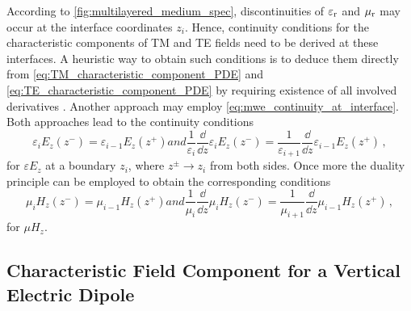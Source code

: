 According to \cref{fig:multilayered_medium_spec}, discontinuities of $\varepsilon_{\mathrm{r}}$ and
$\mu_{\mathrm{r}}$ may occur at the interface coordinates $z_i$.
Hence, continuity conditions for the characteristic components of \ac{TM} and
\ac{TE} fields need to be derived at these interfaces.
A heuristic way to obtain such conditions is to deduce them directly
from \eqref{eq:TM_characteristic_component_PDE} and
\eqref{eq:TE_characteristic_component_PDE} by requiring existence of all 
involved derivatives \cite[47]{Chew1999}.
Another approach may employ \eqref{eq:mwe_continuity_at_interface}.
Both approaches lead to the continuity conditions
\begin{subequations}\label{eq:TM_continuity}
	\begin{equation}\label{eq:TM_continuity_1}
		\varepsilon_i E_{z} \left(z^{-}\right) =
		\varepsilon_{i-1} E_{z} \left(z^{+}\right)
	\end{equation}
	and
	\begin{equation}\label{eq:TM_continuity_2}
		\frac{1}{\varepsilon_i}
		\frac{\dd}{\dd z}
		\varepsilon_i E_{z}\left(z^{-}\right)
		=
		\frac{1}{\varepsilon_{i+1}}
		\frac{\dd}{\dd z}
		\varepsilon_{i-1} E_{z} \left(z^{+}\right)
		\,,
	\end{equation}
\end{subequations}
for  $\varepsilon E_z$ at a boundary $z_i$, where $z^{\pm} \to z_i$ from both
sides.
Once more the duality principle can be employed to obtain the corresponding
conditions 
\begin{subequations}\label{eq:TE_continuity}
	\begin{equation}\label{eq:TE_continuity_1}
		\mu_i H_{z} \left(z^{-}\right) =
		\mu_{i-1} H_{z} \left(z^{+}\right)
	\end{equation}
	and
	\begin{equation}\label{eq:TE_continuity_2}
		\frac{1}{\mu_i}
		\frac{\dd}{\dd z}
		\mu_i H_{z}\left(z^{-}\right)
		=
		\frac{1}{\mu_{i+1}}
		\frac{\dd}{\dd z}
		\mu_{i-1} H_{z} \left(z^{+}\right)
		\,,
	\end{equation}
\end{subequations}
for $\mu H_z$.








\subsection{Characteristic Field Component for a Vertical Electric Dipole}
\label{subsec:E_z_comp_of_VED}

